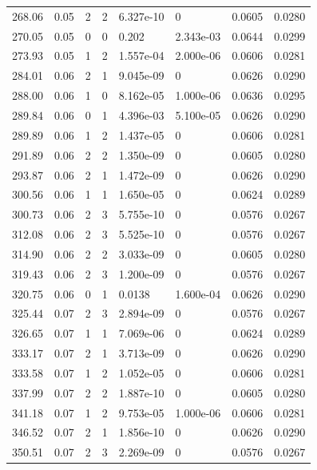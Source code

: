 \documentclass[preview]{standalone}
\begin{document}
{{{\begin{tabular}{L{1.2cm}C{1.2cm} C{0.3cm}C{0.5cm} C{1.4cm}C{1.4cm} C{1.4cm}C{1.4cm}}
  268.06  &  0.05  & 2     &  2 &  6.327e-10  & 0  & 0.0605 &  0.0280   \\ 
  270.05  &  0.05  & 0     &  0 &  0.202  & 2.343e-03  & 0.0644 &  0.0299   \\ 
  273.93  &  0.05  & 1     &  2 &  1.557e-04  & 2.000e-06  & 0.0606 &  0.0281   \\ 
  284.01  &  0.06  & 2     &  1 &  9.045e-09  & 0  & 0.0626 &  0.0290   \\ 
  288.00  &  0.06  & 1     &  0 &  8.162e-05  & 1.000e-06  & 0.0636 &  0.0295   \\ 
  289.84  &  0.06  & 0     &  1 &  4.396e-03  & 5.100e-05  & 0.0626 &  0.0290   \\ 
  289.89  &  0.06  & 1     &  2 &  1.437e-05  & 0  & 0.0606 &  0.0281   \\ 
  291.89  &  0.06  & 2     &  2 &  1.350e-09  & 0  & 0.0605 &  0.0280   \\ 
  293.87  &  0.06  & 2     &  1 &  1.472e-09  & 0  & 0.0626 &  0.0290   \\ 
  300.56  &  0.06  & 1     &  1 &  1.650e-05  & 0  & 0.0624 &  0.0289   \\ 
  300.73  &  0.06  & 2     &  3 &  5.755e-10  & 0  & 0.0576 &  0.0267   \\ 
  312.08  &  0.06  & 2     &  3 &  5.525e-10  & 0  & 0.0576 &  0.0267   \\ 
  314.90  &  0.06  & 2     &  2 &  3.033e-09  & 0  & 0.0605 &  0.0280   \\ 
  319.43  &  0.06  & 2     &  3 &  1.200e-09  & 0  & 0.0576 &  0.0267   \\ 
  320.75  &  0.06  & 0     &  1 &  0.0138  & 1.600e-04  & 0.0626 &  0.0290   \\ 
  325.44  &  0.07  & 2     &  3 &  2.894e-09  & 0  & 0.0576 &  0.0267   \\ 
  326.65  &  0.07  & 1     &  1 &  7.069e-06  & 0  & 0.0624 &  0.0289   \\ 
  333.17  &  0.07  & 2     &  1 &  3.713e-09  & 0  & 0.0626 &  0.0290   \\ 
  333.58  &  0.07  & 1     &  2 &  1.052e-05  & 0  & 0.0606 &  0.0281   \\ 
  337.99  &  0.07  & 2     &  2 &  1.887e-10  & 0  & 0.0605 &  0.0280   \\ 
  341.18  &  0.07  & 1     &  2 &  9.753e-05  & 1.000e-06  & 0.0606 &  0.0281   \\ 
  346.52  &  0.07  & 2     &  1 &  1.856e-10  & 0  & 0.0626 &  0.0290   \\ 
  350.51  &  0.07  & 2     &  3 &  2.269e-09  & 0  & 0.0576 &  0.0267   \\ 

\end{tabular}}}}
\end{document}
